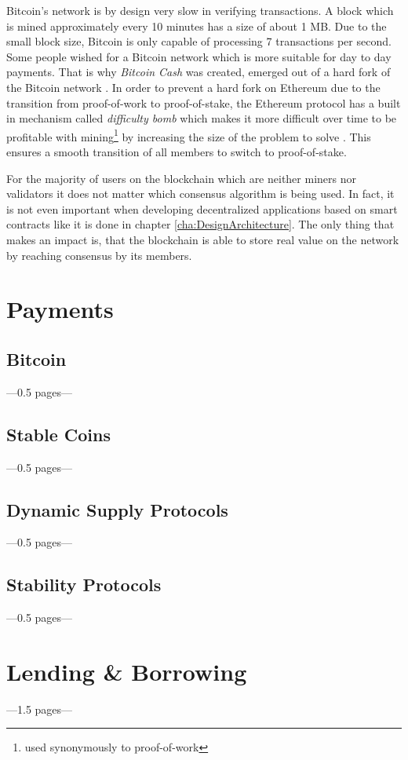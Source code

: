 Bitcoin's network is by design very slow in verifying transactions. A block which is mined approximately every 10 minutes has a size of about 1 MB. Due to the small block size, Bitcoin is only capable of processing 7 transactions per second. Some people wished for a Bitcoin network which is more suitable for day to day payments. That is why \textit{Bitcoin Cash} was created, emerged out of a hard fork of the Bitcoin network \cite{BitcoinCash2020} \cite{HillChopraValencourt2018}. In order to prevent a hard fork on Ethereum due to the transition from proof-of-work to proof-of-stake, the Ethereum protocol has a built in mechanism called \textit{difficulty bomb} which makes it more difficult over time to be profitable with mining\footnote{used synonymously to proof-of-work} by increasing the size of the problem to solve \cite{Wood2020}. This ensures a smooth transition of all members to switch to proof-of-stake.

For the majority of users on the blockchain which are neither miners nor validators it does not matter which consensus algorithm is being used. In fact, it is not even important when developing decentralized applications based on smart contracts like it is done in chapter \ref{cha:DesignArchitecture}. The only thing that makes an impact is, that the blockchain is able to store real value on the network by reaching consensus by its members.

\section{Payments}
\subsection{Bitcoin}
---0.5 pages---
\subsection{Stable Coins}
---0.5 pages---
\subsection{Dynamic Supply Protocols}
---0.5 pages---
\subsection{Stability Protocols}
---0.5 pages---

\section{Lending \& Borrowing}
---1.5 pages---

